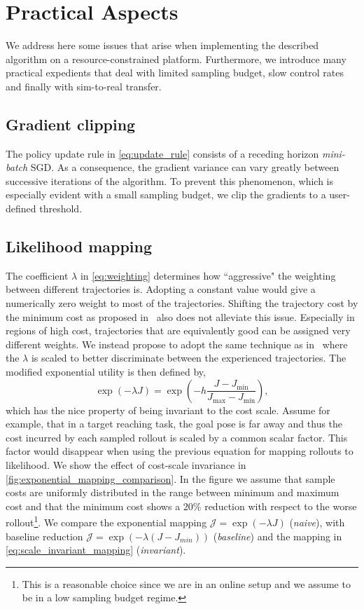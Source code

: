 \section{Practical Aspects} \label{sec:practical_aspects}

We address here some issues that arise when implementing the described algorithm on a resource-constrained platform. Furthermore, we introduce many practical expedients that deal with limited sampling budget, slow control rates and finally with sim-to-real transfer.  

\subsection{Gradient clipping} 
The policy update rule in \eqref{eq:update_rule} consists of a receding horizon \emph{mini-batch} SGD. As a consequence, the gradient variance can vary greatly between successive iterations of the algorithm. To prevent this phenomenon, which is especially evident with a small sampling budget, we clip the gradients to a user-defined threshold.  

\subsection{Likelihood mapping} 
The coefficient $\lambda$ in \eqref{eq:weighting} determines how ``aggressive" the weighting between different trajectories is. Adopting a constant value would give a numerically zero weight to most of the trajectories. Shifting the trajectory cost by the minimum cost as proposed in~\cite{williams_information_2017} also does not alleviate this issue. 
Especially in regions of high cost, trajectories that are equivalently good can be assigned very different weights. We instead propose to adopt the same technique as in~\cite{theodorou2010generalized} where the $\lambda$ is scaled to better discriminate between the experienced trajectories. The modified exponential utility is then defined by,
\begin{equation} \label{eq:scale_invariant_mapping}
    \exp (-\lambda J ) = \exp \left( -h \frac{J - J_{\min}}{J_{\max} - J_{\min}} \right),
\end{equation}
which has the nice property of being invariant to the cost scale. Assume for example, that in a target reaching task, the goal pose is far away and thus the cost incurred by each sampled rollout is scaled by a common scalar factor. This factor would disappear when using the previous equation for mapping rollouts to likelihood. We show the effect of cost-scale invariance in \fig \ref{fig:exponential_mapping_comparison}. In the figure we assume that sample costs are uniformly distributed in the range between minimum and maximum cost and that the minimum cost shows a $20$\% reduction with respect to the worse rollout\footnote{This is a reasonable choice since we are in an online setup and we assume to be in a low sampling budget regime.}. We compare the exponential mapping $\mathcal{J} = \exp(-\lambda J)$ (\textit{naive}), with baseline reduction $\mathcal{J} = \exp(-\lambda (J - J_{min}))$ (\textit{baseline}) and the mapping in \eqref{eq:scale_invariant_mapping} (\textit{invariant}).


